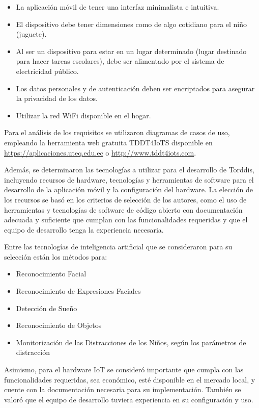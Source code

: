 \documentclass[a4paper,fleqn]{cas-sc}
\begin{document}
				\begin{itemize}
					\item La aplicación móvil de tener una interfaz minimalista e intuitiva.
					\item El dispositivo debe tener dimensiones como de algo cotidiano para el niño (juguete).
					\item Al ser un dispositivo para estar en un lugar determinado (lugar destinado para hacer tareas escolares), debe ser alimentado por el sistema de electricidad público.
					\item Los datos personales y de autenticación deben ser encriptados para asegurar la privacidad de los datos.
					\item Utilizar la red WiFi disponible en el hogar.
				\end{itemize}
				
				Para el análisis de los requisitos se utilizaron diagramas de casos de uso, empleando la herramienta web gratuita TDDT4IoTS disponible en \href{https://aplicaciones.uteq.edu.ec}{https://aplicaciones.uteq.edu.ec} o \href{http://www.tddt4iots.com}{http://www.tddt4iots.com}. 
				
				Además, se determinaron las tecnologías a utilizar para el desarrollo de Torddis, incluyendo recursos de hardware, tecnologías y herramientas de software para el desarrollo de la aplicación móvil y la configuración del hardware. La elección de los recursos se basó en los criterios de selección de los autores, como el uso de herramientas y tecnologías de software de código abierto con documentación adecuada y suficiente que cumplan con las funcionalidades requeridas y que el equipo de desarrollo tenga la experiencia necesaria.
				
				Entre las tecnologías de inteligencia artificial que se consideraron para su selección están los métodos para:
				
				\begin{itemize}
					\item Reconocimiento Facial
					\item Reconocimiento de Expresiones Faciales
					\item Detección de Sueño
					\item Reconocimiento de Objetos
					\item Monitorización de las Distracciones de los Niños, según los parámetros de distracción
				\end{itemize} 
				Asimismo, para el hardware IoT se consideró importante que cumpla con las funcionalidades requeridas, sea económico, esté disponible en el mercado local, y cuente con la documentación necesaria para su implementación. También se valoró que el equipo de desarrollo tuviera experiencia en su configuración y uso.
				
\end{document}
